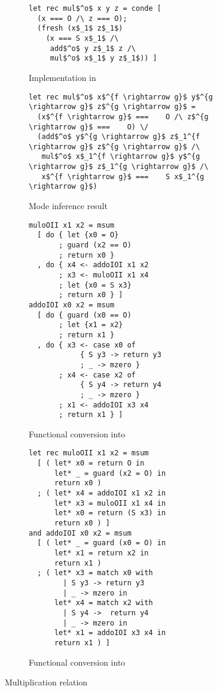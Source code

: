 \begin{figure}[!t]
  \centering
  \begin{subfigure}[b]{0.45\textwidth}
    \begin{lstlisting}[frame=tb]
let rec mul$^o$ x y z = conde [
  (x === O /\ z === O);
  (fresh (x$_1$ z$_1$)
    (x === S x$_1$ /\
     add$^o$ y z$_1$ z /\
     mul$^o$ x$_1$ y z$_1$)) ]
    \end{lstlisting}
   \caption{Implementation in \mk}
    \label{fig:mult_mk}
  \end{subfigure}
  \hfill
  \begin{subfigure}[b]{0.45\textwidth}
    \begin{lstlisting}[frame=tb]
let rec mul$^o$ x$^{f \rightarrow g}$ y$^{g \rightarrow g}$ z$^{g \rightarrow g}$ =
  (x$^{f \rightarrow g}$ ===    O /\ z$^{g \rightarrow g}$ ===    O) \/
  (add$^o$ y$^{g \rightarrow g}$ z$_1^{f \rightarrow g}$ z$^{g \rightarrow g}$ /\
   mul$^o$ x$_1^{f \rightarrow g}$ y$^{g \rightarrow g}$ z$_1^{g \rightarrow g}$ /\
   x$^{f \rightarrow g}$ ===    S x$_1^{g \rightarrow g}$)
    \end{lstlisting}
    \caption{Mode inference result}
    \label{fig:mult_modded}
  \end{subfigure}

  \hfill

  \begin{subfigure}[b]{0.45\textwidth}
    \begin{lstlisting}[frame=tb]
muloOII x1 x2 = msum
  [ do { let {x0 = O}
       ; guard (x2 == O)
       ; return x0 }
  , do { x4 <- addoIOI x1 x2
       ; x3 <- muloOII x1 x4
       ; let {x0 = S x3}
       ; return x0 } ]
addoIOI x0 x2 = msum
  [ do { guard (x0 == O)
       ; let {x1 = x2}
       ; return x1 }
  , do { x3 <- case x0 of
            { S y3 -> return y3
            ; _ -> mzero }
       ; x4 <- case x2 of
            { S y4 -> return y4
            ; _ -> mzero }
       ; x1 <- addoIOI x3 x4
       ; return x1 } ]
    \end{lstlisting}
    \caption{Functional conversion into \haskell}
    \label{fig:mult_haskell}
  \end{subfigure}
\hfill
  \begin{subfigure}[b]{0.45\textwidth}
    \begin{lstlisting}[frame=tb]
let rec muloOII x1 x2 = msum
  [ ( let* x0 = return O in
      let* _ = guard (x2 = O) in
      return x0 )
  ; ( let* x4 = addoIOI x1 x2 in
      let* x3 = muloOII x1 x4 in
      let* x0 = return (S x3) in
      return x0 ) ]
and addoIOI x0 x2 = msum
  [ ( let* _ = guard (x0 = O) in
      let* x1 = return x2 in
      return x1 )
  ; ( let* x3 = match x0 with
        | S y3 -> return y3
        | _ -> mzero in
      let* x4 = match x2 with
        | S y4 ->  return y4
        | _ -> mzero in
      let* x1 = addoIOI x3 x4 in
      return x1 ) ]
    \end{lstlisting}
    \caption{Functional conversion into \ocaml}
    \label{fig:mult_ocaml}
  \end{subfigure}

  \caption{Multiplication relation}
  \label{fig:mult}
\end{figure}
